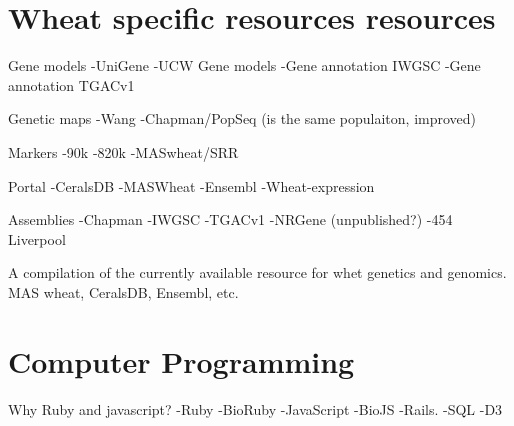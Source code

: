 



\section{Wheat specific resources resources}
\label{lit:wheatResourcers}
Gene models
-UniGene
-UCW Gene models
-Gene annotation IWGSC
-Gene annotation TGACv1

Genetic maps
-Wang
-Chapman/PopSeq (is the same populaiton, improved)

Markers
-90k
-820k
-MASwheat/SRR

Portal
-CeralsDB
-MASWheat
-Ensembl
-Wheat-expression

Assemblies
-Chapman
-IWGSC
-TGACv1
-NRGene (unpublished?)
-454 Liverpool

A compilation of the currently available resource for whet genetics and genomics. MAS wheat, CeralsDB, Ensembl, etc.  

\section{Computer Programming}
Why Ruby and javascript?
-Ruby
-BioRuby
-JavaScript
-BioJS
-Rails. 
-SQL
-D3

